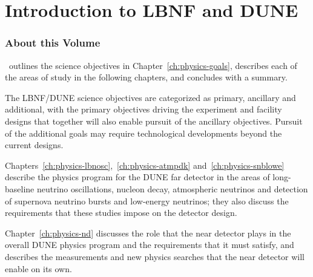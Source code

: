 
\chapter{Introduction to LBNF and DUNE}
\label{ch:physics-overview}



\subsection{About this Volume}


\volphys\, outlines the science objectives in
Chapter~\ref{ch:physics-goals}, describes each of the areas of study in the following
chapters, and concludes with a summary.

The LBNF/DUNE science objectives are categorized as primary, ancillary and additional, 
with the primary objectives driving the experiment and facility designs that together will 
also enable pursuit of the ancillary objectives. 
Pursuit of the additional goals may require technological developments beyond the current designs.

Chapters~\ref{ch:physics-lbnosc},~\ref{ch:physics-atmpdk} and~\ref{ch:physics-snblowe}
describe the physics program for the DUNE far detector in the areas of long-baseline neutrino
oscillations, nucleon decay, atmospheric neutrinos and detection of supernova neutrino
bursts and low-energy neutrinos; they also discuss the requirements that these studies 
impose on the detector design.

Chapter~\ref{ch:physics-nd} discusses the role that the near detector plays in the overall DUNE
physics program and the requirements that it must satisfy, and describes the measurements and 
new physics searches that the near detector will enable on its own.



